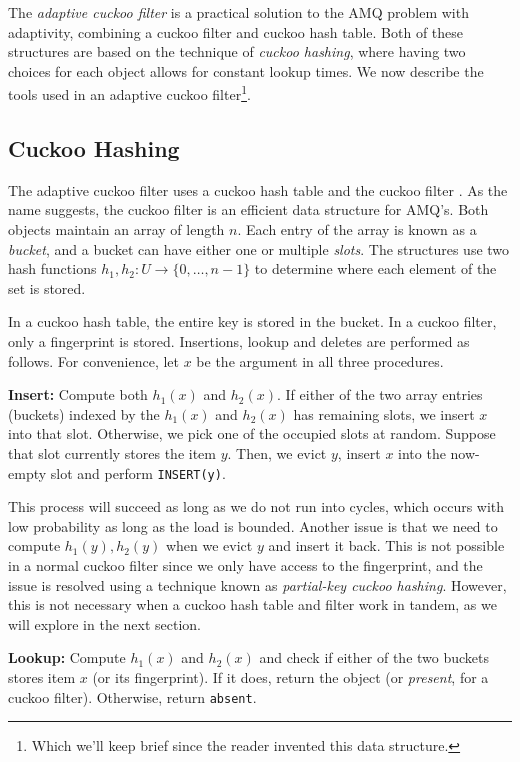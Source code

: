 \documentclass[../paper.tex]{subfiles}
\begin{document}
\newcommand{\on}{\operatorname}
The \emph{adaptive cuckoo filter} \cite{adaptive-cuckoo} is a practical solution to the AMQ problem with adaptivity, combining a cuckoo filter and cuckoo hash table. Both of these structures are based on the
technique of \emph{cuckoo hashing}, where having two choices for each object allows for constant lookup times. We now describe the tools used in an adaptive cuckoo filter\footnote{Which we'll keep brief since the reader invented this data structure.}.

\subsection{Cuckoo Hashing}
The adaptive cuckoo filter uses a cuckoo hash table \cite{cuckoo-hash} and the cuckoo filter \cite{cuckoo-filter}. As the name suggests, the cuckoo filter is an
efficient data structure for AMQ's. Both objects maintain an array of length $n$. Each entry of the array is known as a \emph{bucket}, and a bucket can have either one or multiple \emph{slots}.
The structures use two hash functions $h_1,h_2:U\to \{0,\ldots,n-1\}$ to determine where each element of the set is stored.

In a cuckoo hash table, the entire key is stored in the bucket. In a cuckoo filter, only a fingerprint is stored. Insertions, lookup and deletes are performed as follows. For convenience, let $x$ be the argument in all three procedures.

\textbf{Insert:} Compute both $h_1(x)$ and $h_2(x)$. If either of the two array entries (buckets) indexed by the $h_1(x)$ and $h_2(x)$ has remaining slots, we insert $x$ into that slot.
Otherwise, we pick one of the occupied slots at random. Suppose that slot currently stores the item $y$. Then, we evict $y$, insert $x$ into the now-empty slot and perform \texttt{INSERT(y)}.

This process will succeed as long as we do not run into cycles, which occurs with low probability as long as the load is bounded. Another issue is that we need to compute $h_1(y),h_2(y)$
when we evict $y$ and insert it back. This is not possible in a normal cuckoo filter since we only have access to the fingerprint, and the issue is resolved using a technique known as \emph{partial-key cuckoo hashing}.
However, this is not necessary when a cuckoo hash table and filter work in tandem, as we will explore in the next section.

\textbf{Lookup:} Compute $h_1(x)$ and $h_2(x)$ and check if either of the two buckets stores item $x$ (or its fingerprint). If it does, return the object (or \textit{present}, for a cuckoo filter). Otherwise, return \texttt{absent}.
\end{document}
